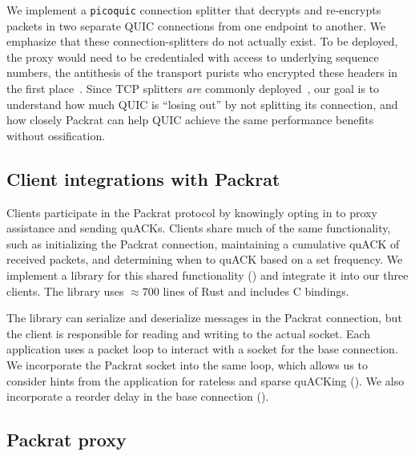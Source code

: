 We implement a \texttt{picoquic} connection splitter that decrypts
and re-encrypts packets in two separate QUIC connections from one endpoint to
another. We emphasize that these connection-splitters do not actually exist. To
be deployed, the proxy would need to be credentialed with access to underlying
sequence numbers, the antithesis of the transport purists who encrypted these
headers in the first place~\cite{rfc9369}. Since TCP splitters \textit
{are} commonly deployed~\cite{honda2011still,rfc3135}, our goal is to
understand how much QUIC is ``losing out'' by not splitting its connection, and
how closely Packrat can help QUIC achieve the same performance benefits without
ossification.

\subsection{Client integrations with Packrat}
\label{sec:packrat:implementation:client-integrations}



Clients participate in the Packrat protocol by knowingly opting in to proxy
assistance and sending quACKs. Clients share much of the same functionality,
such as initializing the Packrat connection, maintaining a cumulative quACK of
received packets, and determining when to quACK based on a set frequency. We
implement a library for this shared functionality ()
and integrate it into our three clients.
The library uses $\approx\!700$ lines of Rust and includes C bindings.

The library can serialize and deserialize messages in the Packrat connection,
but the client is responsible for reading and writing to the actual socket.
Each application uses a packet loop to interact with a socket for the base
connection. We incorporate the Packrat socket into the same loop, which allows
us to consider hints from the application for rateless and sparse quACKing
(). We also incorporate a reorder delay in the
base connection ().

\subsection{Packrat proxy}
\label{sec:packrat:implementation:proxy}

